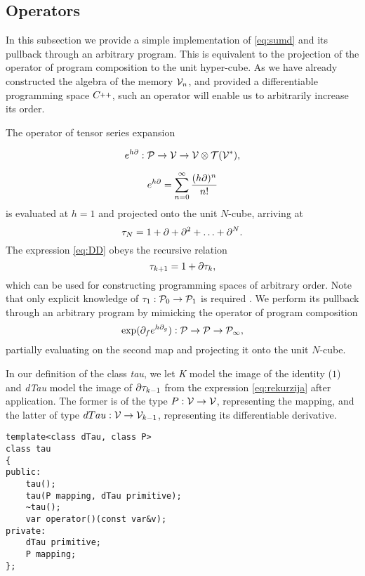              
\subsection{Operators}\label{sec:operators}

In this subsection we provide a simple implementation of \eqref{eq:sumd} and its pullback through an arbitrary program. This is equivalent to the projection of the operator of program composition to the unit hyper-cube. As we have already constructed the algebra of the memory $\mathcal{V}_n$, and provided a differentiable programming space $\CC$, such an operator will enable us to arbitrarily increase its order.

The operator of tensor series expansion \cite[Theorem~5.1]{OperationalCalculus}

\begin{equation}\label{eq:specProg}
            e^{h\partial}:\mathcal{P}\to\mathcal{V}\to \mathcal{V}\otimes \mathcal{T}(\mathcal{V}^*),
          \end{equation}

\begin{equation}
  e^{h\partial}=\sum\limits_{n=0}^{\infty}\frac{(h\partial)^n}{n!}
 \end{equation}
 is evaluated at $h=1$ and projected onto the unit $N$-cube, arriving at 
\begin{equation}\label{eq:DD}
    \tau_N = 1+\partial +\partial^2 +\ldots + \partial^N.
  \end{equation}
The expression \eqref{eq:DD} obeys the recursive relation
\begin{equation}
      \label{eq:rekurzija}
      \tau_{k+1} = 1+\partial\tau_k,
    \end{equation}
which can be used for constructing programming spaces of arbitrary order. Note that only explicit knowledge of $\tau_1:\mathcal{P}_0\to\mathcal{P}_1$ is required \cite[Proposition~5.1]{OperationalCalculus}. We perform its pullback through an arbitrary program by mimicking the operator of program composition \cite[Theorem~5.2]{OperationalCalculus}
\begin{equation}\label{eq:opKompo}
  \exp(\partial_fe^{h\partial_g}): \mathcal{P}\to\mathcal{P}\to\mathcal{P}_\infty,
  \end{equation}
partially evaluating on the second map and projecting it onto the unit $N$-cube.         

In our definition of the class \emph{tau}, we let \emph{K} model the image of the identity ($1$) and \emph{dTau} model the image of $\partial\tau_{k-1}$ from the expression \eqref{eq:rekurzija} after application. The former is of the type $P:\mathcal{V}\to\mathcal{V}$, representing the mapping, and the latter of type $dTau:\mathcal{V}\to\mathcal{V}_{k-1}$, representing its differentiable derivative.  
\begin{lstlisting}
template<class dTau, class P>
class tau
{
public:
    tau();
    tau(P mapping, dTau primitive);
    ~tau();
    var operator()(const var&v);
private:
    dTau primitive;
    P mapping;
};
\end{lstlisting}        
        
